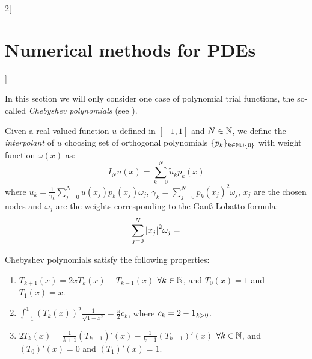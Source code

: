 \documentclass[../../../main_math.tex]{subfiles}
\begin{document}
\begin{multicols}{2}[\section{Numerical methods for PDEs}]
\begin{remark}
    In this section we will only consider one case of polynomial trial functions, the so-called \emph{Chebyshev polynomials} (see ).
  \end{remark}
  \begin{definition}
    Given a real-valued function $u$ defined in $[-1,1]$ and $N\in\mathbb{N}$, we define the \emph{interpolant} of $u$ choosing set of orthogonal polynomials $\{ p_k\}_{k\in\mathbb{N}\cup\{0\}}$ with weight function $\omega(x)$ as:
    $$
      I_Nu(x)=\sum_{k=0}^N \tilde{u}_k p_k(x)
    $$
    where $\tilde{u}_k=\frac{1}{\gamma_k}\sum_{j=0}^N u(x_j)p_k(x_j)\omega_j$, $\gamma_k=\sum_{j=0}^N p_k(x_j)^2\omega_j$, $x_j$ are the chosen nodes and $\omega_j$ are the weights corresponding to the Gau\ss-Lobatto formula:
    $$
      \sum_{j=0}^N\abs{x_j}^2 \omega_j=
    $$
  \end{definition}
  \begin{lemma}
    Chebyshev polynomials satisfy the following properties:
    \begin{enumerate}
      \item $T_{k+1}(x)=2xT_k(x)-T_{k-1}(x)$ $\forall k\in\mathbb{N}$, and $T_0(x)=1$ and $T_1(x)=x$.
      \item $\displaystyle\int_{-1}^1{(T_k(x))}^2\frac{1}{\sqrt{1-x^2}}=\frac{\pi}{2}c_k$, where $c_k=2 - \boldsymbol{\mathrm{1}}_{k>0}$.
      \item $2T_k(x)=\frac{1}{k+1}{(T_{k+1})}'(x)-\frac{1}{k-1}{(T_{k-1})}'(x)$ $\forall k\in\mathbb{N}$, and ${(T_0)}'(x)=0$ and ${(T_1)}'(x)=1$.
    \end{enumerate}
  \end{lemma}
\end{multicols}
\end{document}
